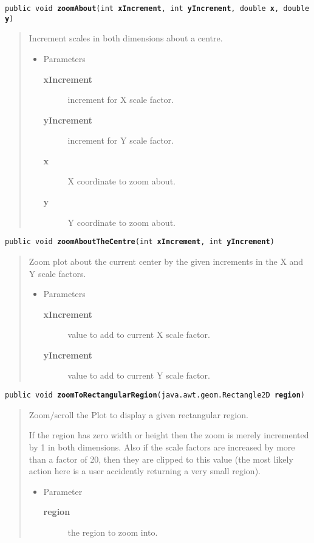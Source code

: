 \documentclass[twoside,11pt,nolof]{starlink}
\providecommand{\method}[1]{\texttt{#1}}
\newenvironment{desc}{\begin{quote}}{\end{quote}}
\begin{document}
\method{public void \textbf{zoomAbout}(\texttt{int} \textbf{xIncrement}, \texttt{int} \textbf{yIncrement}, \texttt{double} \textbf{x}, \texttt{double} \textbf{y})\label{l230}\label{l231}}
\begin{desc}Increment scales in both dimensions about a centre.
\begin{itemize}
\item{Parameters
  \begin{description}
   \item[\textbf{xIncrement}]{increment for X scale factor.}
   \item[\textbf{yIncrement}]{increment for Y scale factor.}
   \item[\textbf{x}]{X coordinate to zoom about.}
   \item[\textbf{y}]{Y coordinate to zoom about.}
  \end{description}}
\end{itemize}
\end{desc}

\method{public void \textbf{zoomAboutTheCentre}(\texttt{int} \textbf{xIncrement}, \texttt{int} \textbf{yIncrement})\label{l232}\label{l233}}
\begin{desc}Zoom plot about the current center by the given increments in
 the X and Y scale factors.
\begin{itemize}
\item{Parameters
  \begin{description}
   \item[\textbf{xIncrement}]{value to add to current X scale factor.}
   \item[\textbf{yIncrement}]{value to add to current Y scale factor.}
  \end{description}}
\end{itemize}
\end{desc}

\method{public void \textbf{zoomToRectangularRegion}(\texttt{java.awt.geom.Rectangle2D} \textbf{region})\label{l234}\label{l235}}
\begin{desc}Zoom$/$scroll the Plot to display a given rectangular region.

 If the region has zero width or height then the zoom is merely
 incremented by 1 in both dimensions. Also if the scale factors
 are increased by more than a factor of 20, then they are
 clipped to this value (the most likely action here is a user
 accidently returning a very small region).
\begin{itemize}
\item{Parameter
  \begin{description}
   \item[\textbf{region}]{the region to zoom into.}
  \end{description}}
\end{itemize}
\end{desc}
\end{document}
